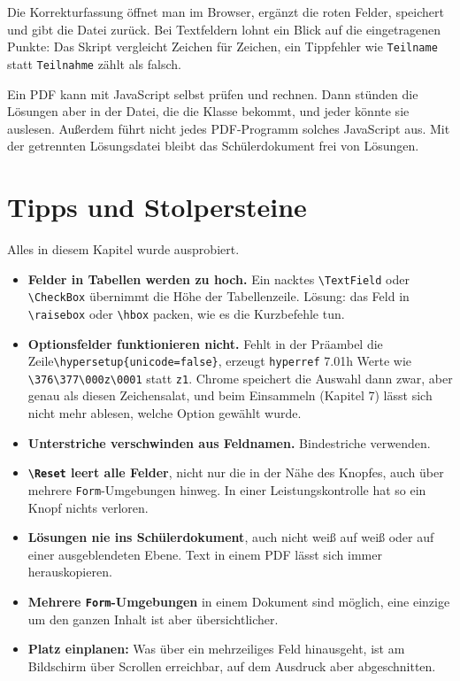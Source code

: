 \begin{Form}
Die Korrekturfassung öffnet man im Browser, ergänzt die roten Felder,
speichert und gibt die Datei zurück. Bei Textfeldern lohnt ein Blick auf
die eingetragenen Punkte: Das Skript vergleicht Zeichen für Zeichen, ein
Tippfehler wie \texttt{Teilname} statt \texttt{Teilnahme} zählt als falsch.

\begin{hinweis}
Ein PDF kann mit JavaScript selbst prüfen und rechnen. Dann stünden die
Lösungen aber in der Datei, die die Klasse bekommt, und jeder könnte sie
auslesen. Außerdem führt nicht jedes PDF-Programm solches JavaScript aus.
Mit der getrennten Lösungsdatei bleibt das Schülerdokument frei von Lösungen.
\end{hinweis}



\section{Tipps und Stolpersteine}

Alles in diesem Kapitel wurde ausprobiert.

\begin{itemize}
	\item \textbf{Felder in Tabellen werden zu hoch.} Ein nacktes
	\verb|\TextField| oder \verb|\CheckBox| übernimmt die Höhe der
	Tabellenzeile. Lösung: das Feld in \verb|\raisebox| oder \verb|\hbox|
	packen, wie es die Kurzbefehle tun.
	\item \textbf{Optionsfelder funktionieren nicht.} Fehlt in der Präambel
	die Zeile\newline \verb|\hypersetup{unicode=false}|, erzeugt \texttt{hyperref} 7.01h
	Werte wie \verb|\376\377\000z\0001| statt \texttt{z1}. Chrome speichert die
	Auswahl dann zwar, aber genau als diesen Zeichensalat, und beim Einsammeln
	(Kapitel 7) lässt sich nicht mehr ablesen, welche Option gewählt wurde.
	\item \textbf{Unterstriche verschwinden aus Feldnamen.} Bindestriche
	verwenden.
	\item \textbf{\texttt{\textbackslash Reset} leert alle Felder}, nicht nur
	die in der Nähe des Knopfes, auch über mehrere \texttt{Form}-Umgebungen
	hinweg. In einer Leistungskontrolle hat so ein Knopf nichts verloren.
	\item \textbf{Lösungen nie ins Schülerdokument}, auch nicht weiß auf weiß
	oder auf einer ausgeblendeten Ebene. Text in einem PDF lässt sich immer
	herauskopieren.
	\item \textbf{Mehrere \texttt{Form}-Umgebungen} in einem Dokument sind
	möglich, eine einzige um den ganzen Inhalt ist aber übersichtlicher.
	\item \textbf{Platz einplanen:} Was über ein mehrzeiliges Feld hinausgeht,
	ist am Bildschirm über Scrollen erreichbar, auf dem Ausdruck aber
	abgeschnitten.
\end{itemize}




\end{Form}
